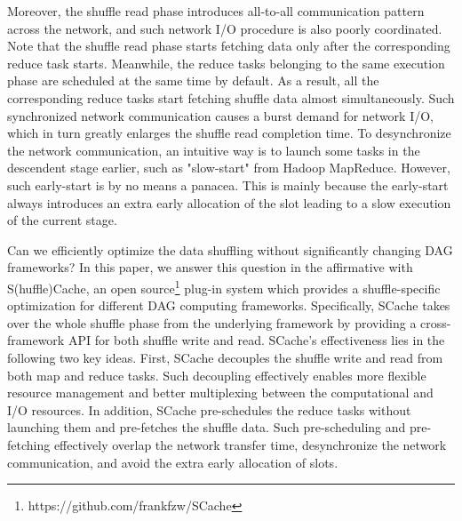 Moreover, the shuffle read phase introduces all-to-all communication pattern across the network, and such network I/O procedure is also poorly coordinated.
Note that the shuffle read phase starts fetching data only after the corresponding reduce task starts.
Meanwhile, the reduce tasks belonging to the same execution phase are scheduled at the same time by default. 
As a result, all the corresponding reduce tasks start fetching shuffle data almost simultaneously.
Such synchronized network communication causes a burst demand for network I/O, which in turn greatly enlarges the shuffle read completion time. 
To desynchronize the network communication, an intuitive way is to launch some tasks in the descendent stage earlier, such as "slow-start" from Hadoop MapReduce.
{\color{black}
However, such early-start is by no means a panacea.
This is mainly because the early-start always introduces an extra early allocation of the slot leading to a slow execution of the current stage.
}


Can we efficiently optimize the data shuffling without significantly changing DAG frameworks?
In this paper, we answer this question in the affirmative with S(huffle)Cache, an open source\footnote{https://github.com/frankfzw/SCache} plug-in system which provides a shuffle-specific optimization for different DAG computing frameworks.
Specifically, SCache takes over the whole shuffle phase from the underlying framework by providing a cross-framework API for both shuffle write and read.
SCache's effectiveness lies in the following two key ideas.
First, SCache decouples the shuffle write and read from both map and reduce tasks.
Such decoupling effectively enables more flexible resource management and better multiplexing between the computational and I/O resources.
In addition, SCache pre-schedules the reduce tasks without launching them and pre-fetches the shuffle data. 
Such pre-scheduling and pre-fetching effectively overlap the network transfer time, desynchronize the network communication, 
and avoid the extra early allocation of slots.

